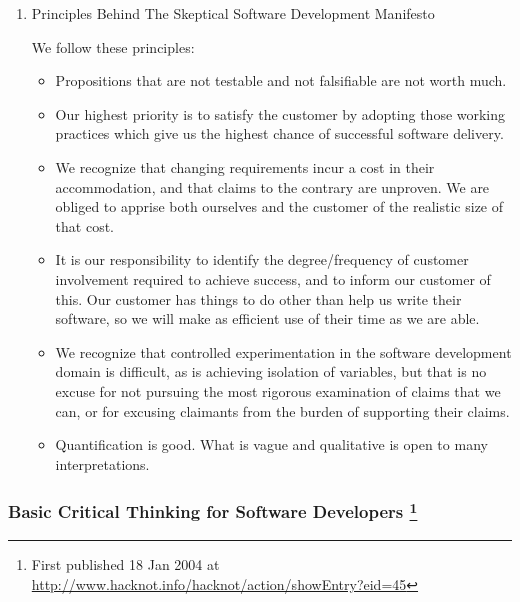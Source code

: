\documentclass{article}
\begin{document}
\begin{enumerate}
\item Principles Behind The Skeptical Software Development Manifesto
\label{sec:orgheadline359}

We follow these principles:

\begin{itemize}
\item Propositions that are not testable and not falsifiable are not worth
much.
\item Our highest priority is to satisfy the customer by adopting those
working practices which give us the highest chance of successful
software delivery.
\item We recognize that changing requirements incur a cost in their
accommodation, and that claims to the contrary are unproven. We are
obliged to apprise both ourselves and the customer of the realistic
size of that cost.
\item It is our responsibility to identify the degree/frequency of customer
involvement required to achieve success, and to inform our customer
of this. Our customer has things to do other than help us write their
software, so we will make as efficient use of their time as we are
able.
\item We recognize that controlled experimentation in the software
development domain is difficult, as is achieving isolation of
variables, but that is no excuse for not pursuing the most rigorous
examination of claims that we can, or for excusing claimants from the
burden of supporting their claims.
\item Quantification is good. What is vague and qualitative is open to many
interpretations.
\end{itemize}
\end{enumerate}

\subsubsection{Basic Critical Thinking for Software Developers \footnote{First published 18 Jan 2004 at
\url{http://www.hacknot.info/hacknot/action/showEntry?eid=45}}}
\label{sec:orgheadline365}
\end{document}
